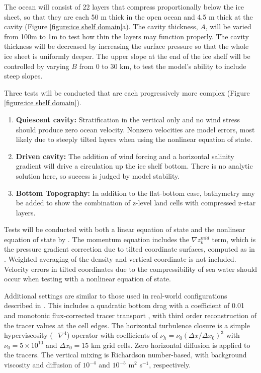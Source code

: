 \documentclass[11pt]{report}
\begin{document}
The ocean will consist of 22 layers that compress proportionally below the ice sheet, so that they are each 50 m thick in the open ocean and 4.5 m thick at the cavity (Figure \ref{figure:ice shelf domain}a).  The cavity thickness, $A$, will be varied from 100m to 1m to test how thin the layers may function properly.  The cavity thickness will be decreased by increasing the surface pressure so that the whole ice sheet is uniformly deeper.  The upper slope at the end of the ice shelf will be controlled by varying $B$ from 0 to 30 km, to test the model's ability to include steep slopes.

Three tests will be conducted that are each progressively more complex (Figure \ref{figure:ice shelf domain}).
\begin{enumerate}
\item {\bf Quiescent cavity:} Stratification in the vertical only and no wind stress should produce zero ocean velocity.  Nonzero velocities are model errors, most likely due to steeply tilted layers when using the nonlinear equation of state.
\item {\bf Driven cavity:} The addition of wind forcing and a horizontal salinity gradient will drive a circulation up the ice shelf bottom.  There is no analytic solution here, so success is judged by model stability.
\item {\bf Bottom Topography:} In addition to the flat-bottom case, bathymetry may be added to show the combination of z-level land cells with compressed z-star layers.
\end{enumerate}

Tests will be conducted with both a linear equation of state and the nonlinear equation of state by \citet{Jackett_McDougall95jaot}.  The momentum equation includes the $\nabla z^{mid}_{k}$ term, which is the pressure gradient correction due to tilted coordinate surfaces, computed as in \citet[Section 2, method 4]{Shchepetkin_McWilliams03jgr}.  Weighted averaging of the density and vertical coordinate \citep[Section 3]{Song98mwr,Shchepetkin_McWilliams03jgr} is not included.  Velocity errors in tilted coordinates due to the compressibility of sea water \citep[Section 7]{Shchepetkin_McWilliams03jgr} should occur when testing with a nonlinear equation of state.

Additional settings are similar to those used in real-world configurations described in \citet{Ringler_ea13om}.  This includes a quadratic bottom drag with a coefficient of 0.01 and monotonic flux-corrected tracer transport \citep{Skamarock_Gassmann11jcp}, with third order reconstruction of the tracer values at the cell edges.  The horizontal turbulence closure is a simple hyperviscosity ($-\nabla^4$) operator with coefficients of $\nu_h = \nu_0 (\Delta x / \Delta x_0)^3$ with $\nu_0=5\times10^{10}$ and $\Delta x_0=15$ km grid cells.  Zero horizontal diffusion is applied to the tracers.  The vertical mixing is Richardson number-based, with background viscosity and diffusion of $10^{-4}$ and $10^{-5}$ m$^2$ s$^{-1}$, respectively.
\end{document}
